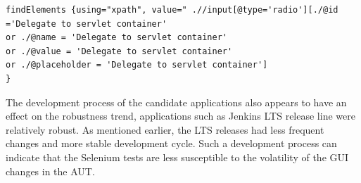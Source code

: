 \begin{center}
\begin{scriptsize}
\centering
\lstset{
  basicstyle=\ttfamily,
  columns=fullflexible,
  keepspaces=true,
}
  
\begin{lstlisting}[caption=Jenkins conditional \texttt{xpath} expression,label=jenkinsxpath]
findElements {using="xpath", value=" .//input[@type='radio'][./@id ='Delegate to servlet container' 
or ./@name = 'Delegate to servlet container' 
or ./@value = 'Delegate to servlet container' 
or ./@placeholder = 'Delegate to servlet container']
}
\end{lstlisting}
\end{scriptsize} 
\end{center}


The development process of the candidate applications also appears to have an effect on the robustness trend, applications such as Jenkins LTS release line were relatively robust. As mentioned earlier, the LTS releases had less frequent changes and more stable development cycle. Such a development process can indicate that the Selenium tests are less susceptible to the volatility of the GUI changes in the AUT.  


